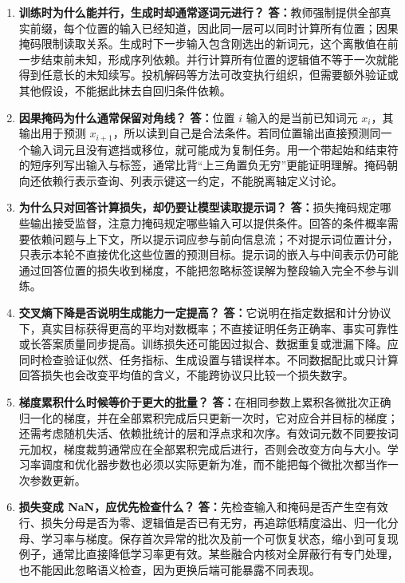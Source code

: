 \documentclass[UTF8,12pt,a4paper,fontset=fandol]{ctexart}
\begin{document}
\begin{enumerate}[resume*=trquestions]
\item \textbf{训练时为什么能并行，生成时却通常逐词元进行？}
\textbf{答：}教师强制提供全部真实前缀，每个位置的输入已经知道，因此同一层可以同时计算所有位置；因果掩码限制读取关系。生成时下一步输入包含刚选出的新词元，这个离散值在前一步结束前未知，形成序列依赖。并行计算所有位置的逻辑值不等于一次就能得到任意长的未知续写。投机解码等方法可改变执行组织，但需要额外验证或其他假设，不能据此抹去自回归条件依赖。

\item \textbf{因果掩码为什么通常保留对角线？}
\textbf{答：}位置 $i$ 输入的是当前已知词元 $x_i$，其输出用于预测 $x_{i+1}$，所以读到自己是合法条件。若同位置输出直接预测同一个输入词元且没有遮挡或移位，就可能成为复制任务。用一个带起始和结束符的短序列写出输入与标签，通常比背“上三角置负无穷”更能证明理解。掩码朝向还依赖行表示查询、列表示键这一约定，不能脱离轴定义讨论。

\item \textbf{为什么只对回答计算损失，却仍要让模型读取提示词？}
\textbf{答：}损失掩码规定哪些输出接受监督，注意力掩码规定哪些输入可以提供条件。回答的条件概率需要依赖问题与上下文，所以提示词应参与前向信息流；不对提示词位置计分，只表示本轮不直接优化这些位置的预测目标。提示词的嵌入与中间表示仍可能通过回答位置的损失收到梯度，不能把忽略标签误解为整段输入完全不参与训练。

\item \textbf{交叉熵下降是否说明生成能力一定提高？}
\textbf{答：}它说明在指定数据和计分协议下，真实目标获得更高的平均对数概率；不直接证明任务正确率、事实可靠性或长答案质量同步提高。训练损失还可能因过拟合、数据重复或泄漏下降。应同时检查验证似然、任务指标、生成设置与错误样本。不同数据配比或只计算回答损失也会改变平均值的含义，不能跨协议只比较一个损失数字。

\item \textbf{梯度累积什么时候等价于更大的批量？}
\textbf{答：}在相同参数上累积各微批次正确归一化的梯度，并在全部累积完成后只更新一次时，它对应合并目标的梯度；还需考虑随机失活、依赖批统计的层和浮点求和次序。有效词元数不同要按词元加权，梯度裁剪通常应在全部累积完成后进行，否则会改变方向与大小。学习率调度和优化器步数也必须以实际更新为准，而不能把每个微批次都当作一次参数更新。

\item \textbf{损失变成 NaN，应优先检查什么？}
\textbf{答：}先检查输入和掩码是否产生空有效行、损失分母是否为零、逻辑值是否已有无穷，再追踪低精度溢出、归一化分母、学习率与梯度。保存首次异常的批次及前一个可恢复状态，缩小到可复现例子，通常比直接降低学习率更有效。某些融合内核对全屏蔽行有专门处理，也不能因此忽略语义检查，因为更换后端可能暴露不同表现。


\end{enumerate}
\end{document}

